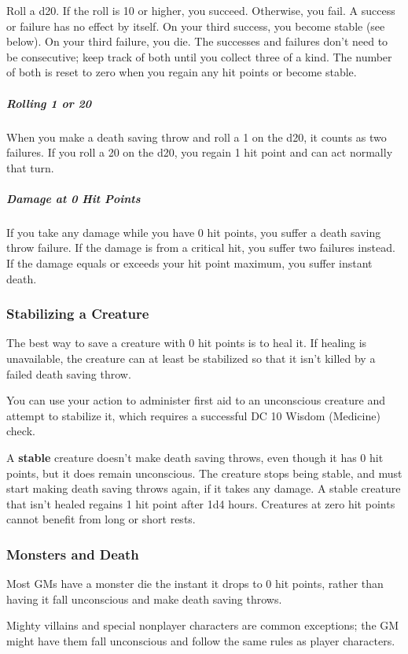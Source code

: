 Roll a d20. If the roll is 10 or higher, you succeed. Otherwise, you fail. A success or failure has no effect by itself. On your third success, you become stable (see below). On your third failure, you die. The successes and failures don't need to be consecutive; keep track of both until you collect three of a kind. The number of both is reset to zero when you regain any hit points or become stable.

\subparagraph*{Rolling 1 or 20} When you make a death saving throw and roll a 1 on the d20, it counts as two failures. If you roll a 20 on the d20, you regain 1 hit point and can act normally that turn.

\subparagraph*{Damage at 0 Hit Points} If you take any damage while you have 0 hit points, you suffer a death saving throw failure. If the damage is from a critical hit, you suffer two failures instead. If the damage equals or exceeds your hit point maximum, you suffer instant death.

\subsubsection{Stabilizing a Creature}

The best way to save a creature with 0 hit points is to heal it. If healing is unavailable, the creature can at least be stabilized so that it isn't killed by a failed death saving throw.

You can use your action to administer first aid to an unconscious creature and attempt to stabilize it, which requires a successful DC 10 Wisdom (Medicine) check.

A \textbf{stable} creature doesn't make death saving throws, even though it has 0 hit points, but it does remain unconscious. The creature stops being stable, and must start making death saving throws again, if it takes any damage. A stable creature that isn't healed regains 1 hit point after 1d4 hours. Creatures at zero hit points cannot benefit from long or short rests.

\subsubsection{Monsters and Death}

Most GMs have a monster die the instant it drops to 0 hit points, rather than having it fall unconscious and make death saving throws.

Mighty villains and special nonplayer characters are common exceptions; the GM might have them fall unconscious and follow the same rules as player characters.

